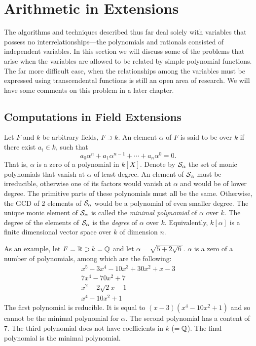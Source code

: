 \chapter{Arithmetic in Extensions}
\label{Arith:Alg:Chap}

The algorithms and techniques described thus far deal solely with
variables that possess no interrelationships---the polynomials and
rationals consisted of independent variables.  In this section we will
discuss some of the problems that arise when the variables are allowed
to be related by simple polynomial functions.  The far more difficult
case, when the relationships among the variables must be expressed
using transcendental functions is still an open area of research.  We
will have some comments on this problem in a later chapter.

\section{Computations in Field Extensions}
\label{Algebraic:Fields:Sec}

Let $F$ and $k$ be arbitrary fields, $F \supset k$.  An element $\alpha$ of
$F$ is said to be  over $k$ if there exist $a_i \in k$,
such that
\[
a_0 \alpha^n + a_1 \alpha^{n-1}  + \cdots + a_n \alpha^0 = 0.
\]
That is, $\alpha$ is a zero of a polynomial in $k[X]$.  Denote by
${\cal S}_{\alpha}$ the set of monic polynomials that vanish at
$\alpha$ of least degree.  An element of ${\cal S}_{\alpha}$ must be
irreducible, otherwise one of its factors would vanish at $\alpha$ and
would be of lower degree.  The primitive parts of these polynomials
must all be the same.  Otherwise, the GCD of 2 elements of ${\cal
S}_{\alpha}$ would be a polynomial of even smaller degree.  The unique
monic element of ${\cal S}_{\alpha}$ is called the {\em minimal
polynomial} of
$\alpha$ over $k$.  The degree of the elements of ${\cal S}_{\alpha}$
is the {\em degree} of $\alpha$ over $k$. Equivalently, $k[\alpha]$ is a finite dimensional
vector space over $k$ of dimension $n$.

As an example, let $F = \mathbb{R} \supset k= \mathbb{Q}$ and let $\alpha = \sqrt{5 + 2
\sqrt{6}}$.  $\alpha$ is a zero of a number of polynomials, among which are
the following:
\[
\begin{array}{c}
x^5 - 3x^4 - 10x^3 + 30x^2 +x -3\\
7x^4 - 70 x^2 + 7 \\
x^2 - 2 \sqrt{2} x -1\\
x^4 - 10x^2 +1
\end{array}
\]
The first polynomial is reducible.  It is equal to $(x-3)(x^4
-10x^2+1)$ and so cannot be the minimal polynomial for $\alpha$.  The
second polynomial has a content of $7$.  The third polynomial does not
have coefficients in $k$ ($=\mathbb{Q}$).  The final polynomial is the minimal
polynomial.

